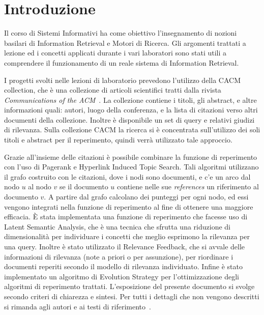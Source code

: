 \section{Introduzione}
\label{sec:introduzione}

Il corso di Sistemi Informativi ha come obiettivo l'insegnamento di nozioni basilari di Information Retrieval e Motori di Ricerca. Gli argomenti trattati a lezione ed i concetti applicati durante i vari laboratori sono stati utili a comprendere il funzionamento di un reale sistema di Information Retrieval.

I progetti svolti nelle lezioni di laboratorio prevedono l'utilizzo della CACM collection, che \`e una collezione di articoli scientifici tratti dalla rivista \textit{Communications of the ACM}~\cite{ACMCollection}. La collezione contiene i titoli, gli abstract, e altre informazioni quali: autori, luogo della conferenza, e la lista di citazioni verso altri documenti della collezione. Inoltre \`e disponibile un set di query e relativi giudizi di rilevanza. Sulla collezione CACM la ricerca si \`e concentrata sull'utilizzo dei soli titoli e abstract per il reperimento, quindi verr\`a utilizzato tale approccio. 

Grazie all'insieme delle citazioni \`e possibile combinare la funzione di reperimento con l'uso di Pagerank e Hyperlink Induced Topic Search. Tali algoritmi utilizzano il grafo costruito con le citazioni, dove i nodi sono  documenti, e c'e un arco dal nodo $u$ al nodo $v$ se il documento $u$ contiene nelle sue \textit{references} un riferimento al documento $v$. A partire dal grafo calcolano dei punteggi per ogni nodo, ed essi vengono integrati nella funzione di reperimento al fine di ottenere una maggiore efficacia. 
\`E stata implementata una funzione di reperimento che facesse uso di Latent Semantic Analysis, che \`e una tecnica che sfrutta una riduzione di dimensionalit\`a per individuare i concetti che meglio esprimono la rilevanza per una query. Inoltre \`e stato utilizzato il Relevance Feedback, che si avvale delle informazioni di rilevanza (note a priori o per assunzione), per riordinare i documenti reperiti secondo il modello di rilevanza individuato.
Infine \`e stato implementato un algoritmo di Evolution Strategy per l'ottimizzazione degli algoritmi di reperimento trattati. L'esposizione del presente documento si svolge secondo criteri di chiarezza e sintesi. Per tutti i dettagli che non vengono descritti si rimanda agli autori e ai testi di riferimento~\cite{manning2008introduction,melucci2013information,croft2010search}.
